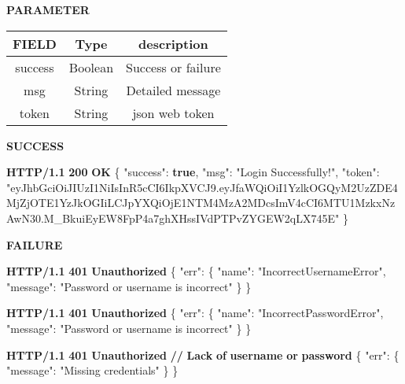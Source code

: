 \documentclass[
]{article}
\newenvironment{Shaded}{}{}
\newcommand{\DataTypeTok}[1]{\textcolor[rgb]{0.56,0.13,0.00}{#1}}
\newcommand{\ErrorTok}[1]{\textcolor[rgb]{1.00,0.00,0.00}{\textbf{#1}}}
\newcommand{\FunctionTok}[1]{\textcolor[rgb]{0.02,0.16,0.49}{#1}}
\newcommand{\KeywordTok}[1]{\textcolor[rgb]{0.00,0.44,0.13}{\textbf{#1}}}
\newcommand{\StringTok}[1]{\textcolor[rgb]{0.25,0.44,0.63}{#1}}
\begin{document}
\textbf{PARAMETER}

\begin{longtable}[]{@{}ccc@{}}
\toprule
FIELD & Type & description\tabularnewline
\midrule
\endhead
success & Boolean & Success or failure\tabularnewline
msg & String & Detailed message\tabularnewline
token & String & json web token\tabularnewline
\bottomrule
\end{longtable}

\textbf{SUCCESS}

\begin{Shaded}
\begin{Highlighting}[]
\ErrorTok{HTTP/1.1} \ErrorTok{200} \ErrorTok{OK}
\FunctionTok{\{} 
    \DataTypeTok{"success"}\FunctionTok{:} \KeywordTok{true}\FunctionTok{,}
    \DataTypeTok{"msg"}\FunctionTok{:} \StringTok{"Login Successfully!"}\FunctionTok{,}
    \DataTypeTok{"token"}\FunctionTok{:} \StringTok{"eyJhbGciOiJIUzI1NiIsInR5cCI6IkpXVCJ9.eyJfaWQiOiI1YzlkOGQyM2UzZDE4MjZjOTE1YzJkOGIiLCJpYXQiOjE1NTM4MzA2MDcsImV4cCI6MTU1MzkxNzAwN30.M_BkuiEyEW8FpP4a7ghXHssIVdPTPvZYGEW2qLX745E"}
\FunctionTok{\}}
\end{Highlighting}
\end{Shaded}

\textbf{FAILURE}

\begin{Shaded}
\begin{Highlighting}[]
\ErrorTok{HTTP/1.1} \ErrorTok{401} \ErrorTok{Unauthorized}
\FunctionTok{\{}
    \DataTypeTok{"err"}\FunctionTok{:} \FunctionTok{\{}
        \DataTypeTok{"name"}\FunctionTok{:} \StringTok{"IncorrectUsernameError"}\FunctionTok{,}
        \DataTypeTok{"message"}\FunctionTok{:} \StringTok{"Password or username is incorrect"}
    \FunctionTok{\}}
\FunctionTok{\}}
\end{Highlighting}
\end{Shaded}

\begin{Shaded}
\begin{Highlighting}[]
\ErrorTok{HTTP/1.1} \ErrorTok{401} \ErrorTok{Unauthorized}
\FunctionTok{\{}
    \DataTypeTok{"err"}\FunctionTok{:} \FunctionTok{\{}
        \DataTypeTok{"name"}\FunctionTok{:} \StringTok{"IncorrectPasswordError"}\FunctionTok{,}
        \DataTypeTok{"message"}\FunctionTok{:} \StringTok{"Password or username is incorrect"}
    \FunctionTok{\}}
\FunctionTok{\}}
\end{Highlighting}
\end{Shaded}

\begin{Shaded}
\begin{Highlighting}[]
\ErrorTok{HTTP/1.1} \ErrorTok{401} \ErrorTok{Unauthorized}
\ErrorTok{//} \ErrorTok{Lack} \ErrorTok{of} \ErrorTok{username} \ErrorTok{or} \ErrorTok{password}
\FunctionTok{\{}
    \DataTypeTok{"err"}\FunctionTok{:} \FunctionTok{\{}
        \DataTypeTok{"message"}\FunctionTok{:} \StringTok{"Missing credentials"}
    \FunctionTok{\}}
\FunctionTok{\}}
\end{Highlighting}
\end{Shaded}
\end{document}
